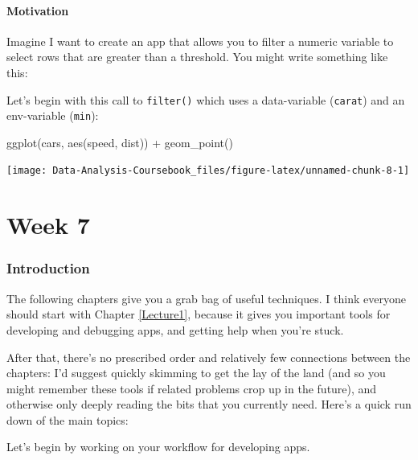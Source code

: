 \documentclass[
]{article}
\newenvironment{Shaded}{\begin{snugshade}}{\end{snugshade}}
\newcommand{\FunctionTok}[1]{\textcolor[rgb]{0.00,0.00,0.00}{#1}}
\newcommand{\NormalTok}[1]{#1}
\newcommand{\SpecialCharTok}[1]{\textcolor[rgb]{0.00,0.00,0.00}{#1}}
\begin{document}
\hypertarget{tidy-motivation}{%
\subsection{Motivation}\label{tidy-motivation}}

Imagine I want to create an app that allows you to filter a numeric variable to select rows that are greater than a threshold.
You might write something like this:

Let's begin with this call to \texttt{filter()} which uses a data-variable (\texttt{carat}) and an env-variable (\texttt{min}):

\begin{Shaded}
\begin{Highlighting}[]
\FunctionTok{ggplot}\NormalTok{(cars, }\FunctionTok{aes}\NormalTok{(speed, dist)) }\SpecialCharTok{+} 
  \FunctionTok{geom\_point}\NormalTok{()}
\end{Highlighting}
\end{Shaded}

\begin{center}\texttt{[image: Data-Analysis-Coursebook\_files/figure-latex/unnamed-chunk-8-1]} \end{center}

\hypertarget{part-week-7}{%
\part*{Week 7}\label{part-week-7}}

\hypertarget{week7-intro}{%
\section*{Introduction}\label{week7-intro}}

The following chapters give you a grab bag of useful techniques.
I think everyone should start with Chapter \ref{Lecture1}, because it gives you important tools for developing and debugging apps, and getting help when you're stuck.

After that, there's no prescribed order and relatively few connections between the chapters: I'd suggest quickly skimming to get the lay of the land (and so you might remember these tools if related problems crop up in the future), and otherwise only deeply reading the bits that you currently need.
Here's a quick run down of the main topics:

Let's begin by working on your workflow for developing apps.
\end{document}
